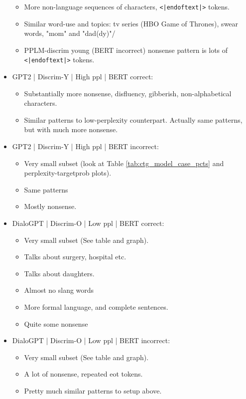 \begin{itemize}
\begin{itemize}
        \item More non-language sequences of characters, \texttt{<|endoftext|>} tokens.
        \item Similar word-use and topics: tv series (HBO Game of Thrones), swear words, "mom" and "dad(dy)"/
        \item PPLM-discrim young (BERT incorrect) nonsense pattern is lots of \texttt{<|endoftext|>} tokens.
    \end{itemize}
    \item GPT2 | Discrim-Y | High ppl | BERT correct:
    \begin{itemize}
        \item Substantially more nonsense, disfluency, gibberish, non-alphabetical characters.
        \item Similar patterns to low-perplexity counterpart. Actually same patterns, but with much more nonsense.
    \end{itemize}
    \item GPT2 | Discrim-Y | High ppl | BERT incorrect:
    \begin{itemize}
        \item Very small subset (look at Table \ref{tab:ctg_model_case_pcts} and perplexity-targetprob plots).
        \item Same patterns
        \item Mostly nonsense.
    \end{itemize}
    \item DialoGPT | Discrim-O | Low ppl | BERT correct:
    \begin{itemize}
        \item Very small subset (See table and graph).
        \item Talks about surgery, hospital etc.
        \item Talks about daughters.
        \item Almost no slang words
        \item More formal language, and complete sentences.
        \item Quite some nonsense
    \end{itemize}
    \item DialoGPT | Discrim-O | Low ppl | BERT incorrect:
    \begin{itemize}
        \item Very small subset (See table and graph).
        \item A lot of nonsense, repeated eot tokens.
        \item Pretty much similar patterns to setup above.

\end{itemize}
\end{itemize}
